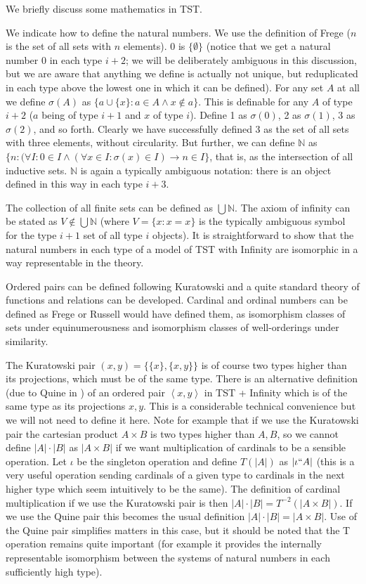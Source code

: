 \documentclass[112pt]{article}
\begin{document}
We briefly discuss some mathematics in TST.

We indicate how to define the natural numbers.  We use the definition of Frege ($n$ is the set of all sets with $n$ elements).  0 is $\{\emptyset\}$ (notice that we get a natural number 0 in each type $i+2$;  we will be deliberately ambiguous in this discussion, but we are aware that anything we define is actually not unique, but reduplicated in each type above the lowest one in which it can be defined).  For any set $A$ at all we define $\sigma(A)$ as $\{a \cup \{x\}:a \in A \wedge x \not\in a\}$.  This is definable for any $A$ of type $i+2$ ($a$ being of type $i+1$ and $x$ of type $i$).  Define 1 as $\sigma(0)$, 2 as $\sigma(1)$,  3 as $\sigma(2)$, and so forth.  Clearly we have successfully defined 3 as the set of all sets with three elements, without circularity.
But further, we can define $\mathbb N$ as $\{n:(\forall I:0 \in I \wedge (\forall x \in I:\sigma(x) \in I) \rightarrow n \in I\}$, that is, as the intersection of all inductive sets.
$\mathbb N$ is again a typically ambiguous notation:  there is an object defined in this way in each type $i+3$.

The collection of all finite sets can be defined as $\bigcup \mathbb N$.  The axiom of infinity can be stated as $V \not\in \bigcup \mathbb N$ (where $V= \{x:x=x\}$ is the typically ambiguous symbol for the type $i+1$ set of all type $i$ objects).  It is straightforward to show that the natural numbers in each type of a model of TST with Infinity are isomorphic in a way representable in the theory.

Ordered pairs can be defined following Kuratowski and a quite standard theory of functions and relations can be developed.  Cardinal and ordinal numbers can be defined as Frege or Russell would have defined them, as isomorphism classes of sets under equinumerousness and isomorphism classes of well-orderings under similarity.  

The Kuratowski pair $(x,y) = \{\{x\},\{x,y\}\}$ is of course two types higher than its projections, which must be of the same type.  There is an alternative definition (due to Quine in \cite{quinepair}) of an ordered pair
$\left< x,y\right>$ in TST + Infinity which is of the same type as its projections $x,y$.  This is a considerable technical convenience but we will not need to define it here.  Note for example that if we use the Kuratowski pair the cartesian product $A \times B$ is two types higher than $A,B$, so we cannot define $|A| \cdot |B|$ as $|A \times B|$ if we want multiplication of cardinals to be a sensible operation.  Let $\iota$ be the singleton operation and define $T(|A|)$ as $|\iota``A|$ (this is a very useful operation sending cardinals of a given type to cardinals in the next higher type which seem intuitively to be the same).  The definition of cardinal multiplication if we use the Kuratowski pair is then $|A| \cdot |B| =T^{-2}(|A\times B|)$.  If we use the Quine pair this becomes the usual definition $|A| \cdot |B| =|A\times B|$.  Use of the Quine pair simplifies matters in this case, but it should be noted that the T operation remains quite important (for example it provides the internally representable isomorphism between the systems of natural numbers in each sufficiently high type).
\end{document}
